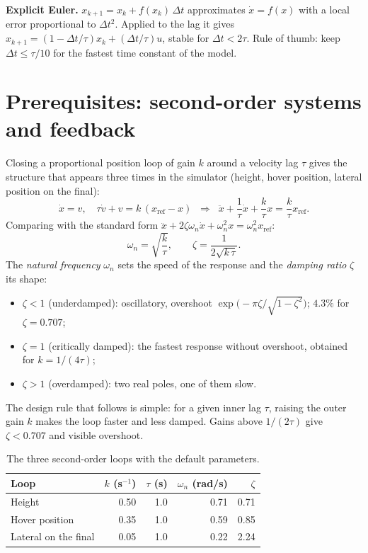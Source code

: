 \documentclass[11pt,a4paper]{article}
\begin{document}
\textbf{Explicit Euler.} $x_{k+1}=x_k+f(x_k)\,\Delta t$ approximates
$\dot x=f(x)$ with a local error proportional to $\Delta t^2$. Applied to the
lag it gives $x_{k+1}=(1-\Delta t/\tau)x_k+(\Delta t/\tau)u$, stable for
$\Delta t<2\tau$. Rule of thumb: keep $\Delta t\le\tau/10$ for the fastest
time constant of the model.

\section{Prerequisites: second-order systems and feedback}\label{app:second}

Closing a proportional position loop of gain $k$ around a velocity lag $\tau$
gives the structure that appears three times in the simulator (height, hover
position, lateral position on the final):
\begin{equation}
\dot x = v,\quad \tau\dot v + v = k\,(x_{\text{ref}}-x)
\;\;\Longrightarrow\;\;
\ddot x + \frac{1}{\tau}\dot x + \frac{k}{\tau}x = \frac{k}{\tau}x_{\text{ref}} .
\end{equation}
Comparing with the standard form
$\ddot x+2\zeta\omega_n\dot x+\omega_n^2x=\omega_n^2x_{\text{ref}}$:
\begin{equation}
\omega_n=\sqrt{\frac{k}{\tau}},\qquad \zeta=\frac{1}{2\sqrt{k\,\tau}} .
\end{equation}
The \emph{natural frequency} $\omega_n$ sets the speed of the response and the
\emph{damping ratio} $\zeta$ its shape:
\begin{itemize}
\item $\zeta<1$ (underdamped): oscillatory, overshoot
$\exp\bigl(-\pi\zeta/\sqrt{1-\zeta^2}\bigr)$; $4.3\%$ for $\zeta=0.707$;
\item $\zeta=1$ (critically damped): the fastest response without overshoot,
obtained for $k=1/(4\tau)$;
\item $\zeta>1$ (overdamped): two real poles, one of them slow.
\end{itemize}
The design rule that follows is simple: for a given inner lag $\tau$, raising
the outer gain $k$ makes the loop faster and less damped. Gains above
$1/(2\tau)$ give $\zeta<0.707$ and visible overshoot.

\begin{table}[H]
\centering\small
\begin{tabular}{@{}lrrrr@{}}
\toprule
Loop & $k$ (s$^{-1}$) & $\tau$ (s) & $\omega_n$ (rad/s) & $\zeta$ \\
\midrule
Height & 0.50 & 1.0 & 0.71 & 0.71 \\
Hover position & 0.35 & 1.0 & 0.59 & 0.85 \\
Lateral on the final & 0.05 & 1.0 & 0.22 & 2.24 \\
\bottomrule
\end{tabular}
\caption{The three second-order loops with the default parameters.}
\end{table}
\end{document}
